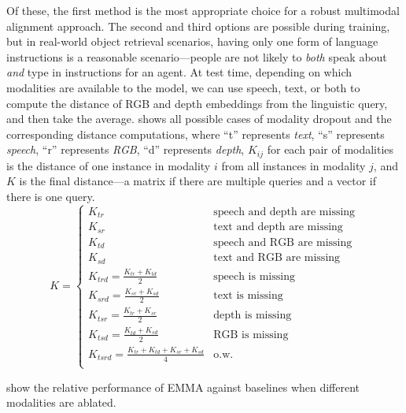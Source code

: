 \documentclass[sigconf,natbib=true,anonymous=true]{acmart}
\begin{document}
Of these, the first method is the most appropriate choice for a robust multimodal alignment approach. The second and third options are possible during training, but in real-world object retrieval scenarios, having only one form of language instructions is a reasonable scenario---people are not likely to \textit{both} speak about \textit{and} type in instructions for an agent. At test time, depending on which modalities are available to the model, we can use speech, text, or both to compute the distance of RGB and depth embeddings from the linguistic query, and then take the average.
 shows all possible cases of modality dropout and the corresponding distance computations, where ``t'' represents \textit{text}, ``s'' represents \textit{speech}, ``r'' represents \textit{RGB}, ``d'' represents \textit{depth}, $K_{ij}$ for each pair of modalities is the distance of one instance in modality $i$ from all instances in modality $j$, and $K$ is the final distance---a matrix if there are multiple queries and a vector if there is one query.
\begin{equation}
\label{eq:distance-matrix}
K = 
    \begin{cases} 
        K_{tr} & \text{speech and depth are missing} \\
        K_{sr} & \text{text and depth are missing} \\
        K_{td} & \text{speech and RGB are missing} \\
        K_{sd} & \text{text and RGB are missing} \\
        K_{trd} = \frac{K_{tr} + K_{td} }{2} & \text{speech is missing} \\
        K_{srd} = \frac{K_{sr} + K_{sd} }{2} & \text{text is missing} \\
        K_{tsr} = \frac{K_{tr} + K_{sr} }{2} & \text{depth is missing} \\
        K_{tsd} = \frac{K_{td} + K_{sd} }{2} & \text{RGB is missing} \\
        K_{tsrd} = \frac{K_{tr} + K_{td} + K_{sr} + K_{sd} }{4} & \text{o.w.} \\
    \end{cases}
\end{equation}


 show the relative performance of EMMA against baselines when different modalities are ablated.
\end{document}
